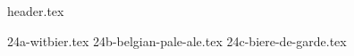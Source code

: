 \clearpage
{}
\divisorLine
{header.tex}
\begin{multicols*}{2}
{24a-witbier.tex}
{24b-belgian-pale-ale.tex}
{24c-biere-de-garde.tex}
\end{multicols*}
